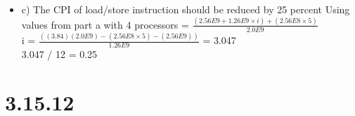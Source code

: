 \documentclass{article}
\begin{document}
\begin{itemize}
    \item c) The CPI of load/store instruction should be reduced by 25 percent\newline
    Using values from part a with 4 processors = $\frac{(2.56E9 + 1.26E9 \times i) + (2.56E8 \times 5)}{2.0E9}$\newline
    \ \\
    i = $\frac{((3.84)(2.0E9) - (2.56E8 \times 5) - (2.56E9))}{1.26E9}$ = 3.047\newline
    \ \\
    3.047 / 12 = 0.25\newline
    
\end{itemize}

\section{3.15.12}
\end{document}
